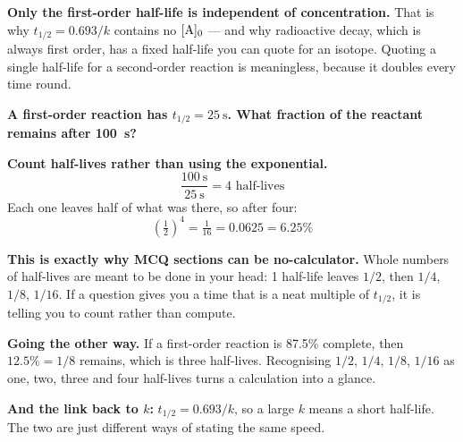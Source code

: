 \documentclass{apchem-worksheet}
\begin{document}
\begin{apctrap}
\textbf{Only the first-order half-life is independent of
concentration.} That is why $t_{1/2} = 0.693/k$ contains no
$[\ce{A}]_{0}$ --- and why radioactive decay, which is always first
order, has a fixed half-life you can quote for an isotope. Quoting a
single half-life for a second-order reaction is meaningless, because it
doubles every time round.
\end{apctrap}

\begin{workedexample}
\textbf{A first-order reaction has $t_{1/2} = \SI{25}{\second}$. What
fraction of the reactant remains after \SI{100}{\second}?}

\textbf{Count half-lives rather than using the exponential.}
\[ \frac{\SI{100}{\second}}{\SI{25}{\second}} = 4
   \text{ half-lives} \]
Each one leaves half of what was there, so after four:
\[ \left(\tfrac{1}{2}\right)^{4} = \tfrac{1}{16}
   = \mathbf{0.0625} = 6.25\% \]

\textbf{This is exactly why MCQ sections can be no-calculator.} Whole
numbers of half-lives are meant to be done in your head: 1 half-life
leaves $1/2$, then $1/4$, $1/8$, $1/16$. If a question gives you a time
that is a neat multiple of $t_{1/2}$, it is telling you to count rather
than compute.

\textbf{Going the other way.} If a first-order reaction is 87.5\%
complete, then $12.5\% = 1/8$ remains, which is three half-lives.
Recognising $1/2$, $1/4$, $1/8$, $1/16$ as one, two, three and four
half-lives turns a calculation into a glance.

\textbf{And the link back to $k$:} $t_{1/2} = 0.693/k$, so a large $k$
means a short half-life. The two are just different ways of stating the
same speed.
\end{workedexample}
\end{document}
